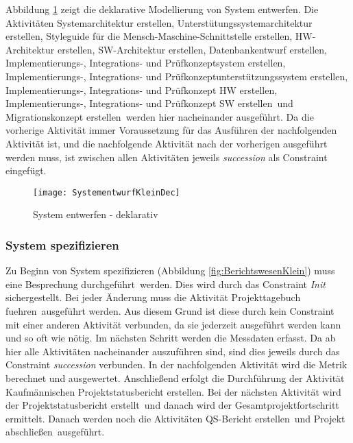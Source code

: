 {Abbildung \ref{fig:SystementwurfKleinDec} zeigt die deklarative Modellierung von System entwerfen.\newline
Die Aktivitäten \grqq Systemarchitektur erstellen, Unterstütungssystemarchitektur erstellen, Styleguide für die Mensch-Maschine-Schnittstelle erstellen, HW-Architektur erstellen, SW-Architektur erstellen, Datenbankentwurf erstellen, Implementierungs-, Integrations- und Prüfkonzeptsystem erstellen, Implementierungs-, Integrations- und Prüfkonzeptunterstützungssystem erstellen, Implementierungs-, Integrations- und Prüfkonzept HW erstellen, Implementierungs-, Integrations- und Prüfkonzept SW erstellen\grqq \ und \grqq Migrationskonzept erstellen\grqq \ werden hier nacheinander ausgeführt. Da die vorherige Aktivität immer Voraussetzung für das Ausführen der nachfolgenden Aktivität ist, und die nachfolgende Aktivität nach der vorherigen ausgeführt werden muss, ist zwischen allen Aktivitäten jeweils \textit{succession} als Constraint eingefügt.

\begin{figure}[!htbp]
\begin{center}
  \texttt{[image: SystementwurfKleinDec]} %
  \caption{System entwerfen - deklarativ}
  \label{fig:SystementwurfKleinDec}
\end{center}
\end{figure}

\subsubsection{System spezifizieren}


Zu Beginn von System spezifizieren (Abbildung \ref{fig:BerichtswesenKlein}) muss eine \grqq Besprechung durchgeführt\grqq \ werden. Dies wird durch das Constraint \textit{Init} sichergestellt. Bei jeder Änderung muss die Aktivität \grqq Projekttagebuch fuehren\grqq \ ausgeführt werden. Aus diesem Grund ist diese durch kein Constraint mit einer anderen Aktivität verbunden, da sie jederzeit ausgeführt werden kann und so oft wie nötig.
Im nächsten Schritt werden die \grqq Messdaten erfasst\grqq. Da ab hier alle Aktivitäten nacheinander auszuführen sind, sind dies jeweils durch das Constraint \textit{succession} verbunden.\newline
In der nachfolgenden Aktivität wird die \grqq Metrik berechnet und ausgewertet\grqq.\newline
Anschließend erfolgt die Durchführung der Aktivität \grqq Kaufmännischen Projektstatusbericht erstellen\grqq.\newline
Bei der nächsten Aktivität wird der \grqq Projektstatusbericht erstellt\grqq \ und danach wird der \grqq Gesamtprojektfortschritt ermittelt\grqq.
Danach werden noch die Aktivitäten \grqq QS-Bericht erstellen\grqq \ und \grqq Projekt abschließen\grqq \ ausgeführt.

}

